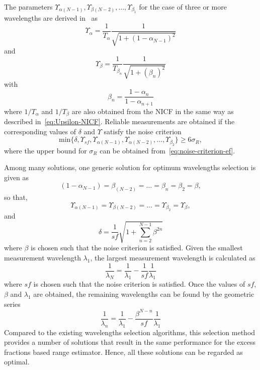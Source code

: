 The parameters $\Upsilon_{\alpha(N-1)}, \Upsilon_{\beta(N-2)}, \ldots, \Upsilon_{\beta_1}$ for the case of three or more wavelengths are derived in~\cite{Falaggis_excess_fractions_2011} as
\[
\Upsilon_{\alpha} = \frac{1}{T_{\alpha}} \frac{1}{\sqrt{1 + (1 - \alpha_{N-1})^2}}
\]
and
\[
\Upsilon_{\beta} = \frac{1}{T_{\beta_n}} \frac{1}{\sqrt{1 + (\beta_n)^2}}
\]
with
\[
\beta_n = \frac{1 - \alpha_n}{1 - \alpha_{n+1}}
\]
where $1/T_{\alpha}$ and $1/T_{\beta}$ are also obtained from the NICF in the same way as described in~\ref{eq:Upsilon-NICF}. Reliable measurements are obtained if the corresponding values of $\delta$ and $\Upsilon$ satisfy the noise criterion
\[
\text{min} \{   \delta, \Upsilon_{sf}, \Upsilon_{\alpha(N-1)}, \Upsilon_{\alpha(N-2)} , \ldots, \Upsilon_{\beta_2}  \} \geq 6\sigma_R,
\]
where the upper bound for $\sigma_R$ can be obtained from~\ref{eq:noise-criterion-ef}.

Among many solutions, one generic solution for optimum wavelengths selection is given as~\cite{Falaggis_excess_fractions_2012}
\[
(1 - \alpha_{N-1}) = \beta_{(N-2)} = \ldots = \beta_n = \beta_2 = \beta,
\]
so that,
\[
\Upsilon_{\alpha(N-1)} = \Upsilon_{\beta(N-2)} = \ldots = \Upsilon_{\beta_2} = \Upsilon_{\beta},
\]
and
\[
\delta = \frac{1}{sf} \sqrt{1 + \sum_{n=2}^{N-1} \beta^{2n}}
\]
where $\beta$ is chosen such that the noise criterion is satisfied. Given the smallest measurement wavelength $\lambda_1$, the largest measurement wavelength is calculated as
\[
\frac{1}{\lambda_N} = \frac{1}{\lambda_1} - \frac{1}{sf}\frac{1}{\lambda_1}
\]
where $sf$ is chosen such that the noise criterion is satisfied. Once the values of $sf$, $\beta$ and $\lambda_1$ are obtained, the remaining wavelengths can be found by the geometric series~\cite{Falaggis_excess_fractions_2012}
\[
\frac{1}{\lambda_n} =  \frac{1}{\lambda_1} - \frac{\beta^{N-n}}{sf} \frac{1}{\lambda_1}
\]
Compared to the existing wavelengths selection algorithms, this selection method provides a number of solutions that result in the same performance for the excess fractions based range estimator. Hence, all these solutions can be regarded as optimal.

